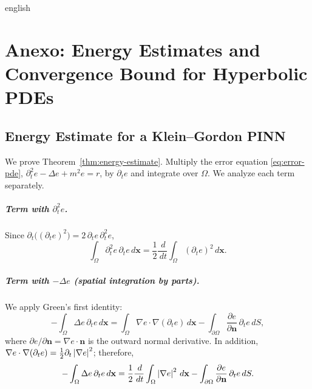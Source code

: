 
\begin{hyphenrules}{english}

\chapter{Anexo: Energy Estimates and Convergence Bound for Hyperbolic PDEs}\label{app:derivations}

\section{Energy Estimate for a Klein--Gordon PINN}\label{app:energy}

We prove Theorem~\ref{thm:energy-estimate}. Multiply the error equation \eqref{eq:error-pde},
$\partial_t^2e-\Delta e+m^2e=r$, by $\partial_te$ and integrate over $\Omega$. We analyze each term
separately.

\paragraph{Term with $\partial_t^2e$.}
Since $\partial_t\big((\partial_te)^2\big)=2\,\partial_te\,\partial_t^2e$,
\[
  \int_\Omega\partial_t^2e\,\partial_te\,d\mathbf{x}=\frac12\frac{\,d}{\,d t}\int_\Omega(\partial_te)^2\,d\mathbf{x}.
\]

\paragraph{Term with $-\Delta e$ (spatial integration by parts).}
We apply Green's first identity:
\[
  -\int_\Omega\Delta e\,\partial_te\,d\mathbf{x}=\int_\Omega\nabla e\cdot\nabla(\partial_te)\,d\mathbf{x}
  -\int_{\partial\Omega}\frac{\partial e}{\partial\mathbf{n}}\,\partial_te\,d S,
\]
where $\partial e/\partial\mathbf{n}=\nabla e\cdot\mathbf{n}$ is the outward normal derivative. In addition,
$\nabla e\cdot\nabla(\partial_te)=\frac12\partial_t\left\lvert \nabla e \right\rvert^2$; therefore,
\begin{equation}
  -\int_\Omega\Delta e\,\partial_te\,d\mathbf{x}=\frac12\frac{\,d}{\,d t}\int_\Omega\left\lvert \nabla e \right\rvert^2\,d\mathbf{x}
  -\int_{\partial\Omega}\frac{\partial e}{\partial\mathbf{n}}\,\partial_te\,d S.
  \label{eq:app-lap}
\end{equation}


\end{hyphenrules}
